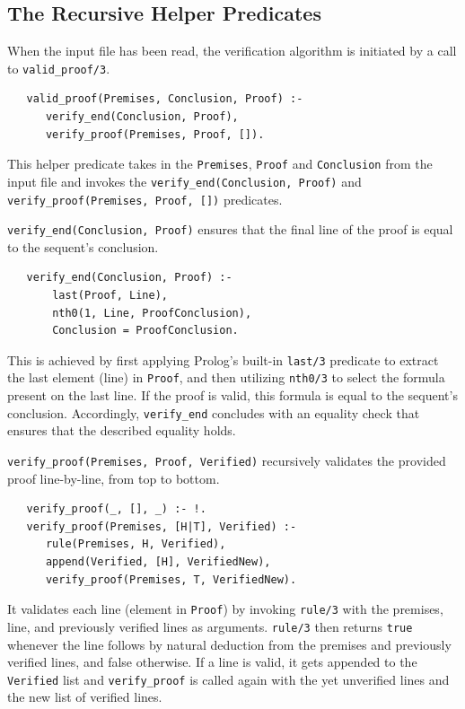 \documentclass[a4paper, 11pt]{article}
\begin{document}
   \subsection{The Recursive Helper Predicates}
   \label{recursive-helper-predicates}

   When the input file has been read, the verification
   algorithm is initiated by a call to
   \texttt{valid\_proof/3}. 
   
\begin{verbatim}
   valid_proof(Premises, Conclusion, Proof) :- 
      verify_end(Conclusion, Proof),
      verify_proof(Premises, Proof, []).
\end{verbatim}

   This helper predicate takes in the
   \texttt{Premises}, \texttt{Proof} and \texttt{Conclusion}
   from the input file and invokes the 
   \texttt{verify\_end(Conclusion, Proof)} and \\
   \texttt{verify\_proof(Premises, Proof, [])} predicates.
   \bigbreak

   \texttt{verify\_end(Conclusion, Proof)} ensures 
   that the final line of the proof is equal to the
   sequent's conclusion. 
   
\begin{verbatim}
   verify_end(Conclusion, Proof) :-
       last(Proof, Line),              
       nth0(1, Line, ProofConclusion),
       Conclusion = ProofConclusion.
\end{verbatim}
   
   This is achieved by
   first applying Prolog's built-in \texttt{last/3}
   predicate to extract the last element (line) in
   \texttt{Proof}, and then utilizing \texttt{nth0/3} 
   to select the formula present on the last line. If
   the proof is valid, this formula is equal to
   the sequent's conclusion. Accordingly, 
   \texttt{verify\_end} concludes with an equality
   check that ensures that the described equality
   holds.
   \bigbreak

   \texttt{verify\_proof(Premises, Proof, Verified)}
   recursively validates the provided proof
   line-by-line, from top to bottom. 
   
\begin{verbatim}
   verify_proof(_, [], _) :- !.
   verify_proof(Premises, [H|T], Verified) :-
      rule(Premises, H, Verified),
      append(Verified, [H], VerifiedNew),
      verify_proof(Premises, T, VerifiedNew).
\end{verbatim}

   It validates each 
   line (element in \texttt{Proof}) by invoking 
   \texttt{rule/3} with the premises, line, and 
   previously verified lines as arguments. 
   \texttt{rule/3} then returns \texttt{true} whenever 
   the line follows by natural deduction from the 
   premises and previously verified lines, and false
   otherwise. If a line is valid, it gets appended to
   the \texttt{Verified} list and \texttt{verify\_proof}
   is called again with the yet unverified lines and
   the new list of verified lines.
   \bigbreak
\end{document}
